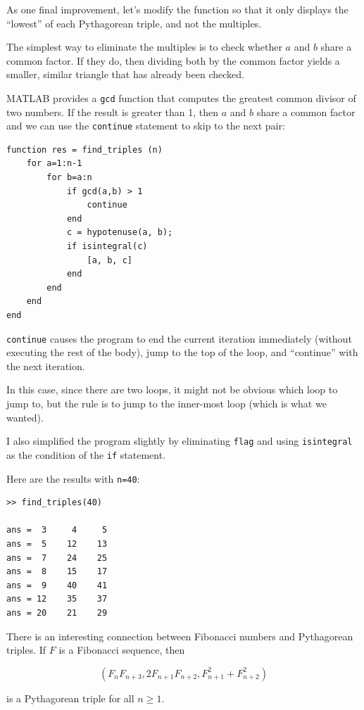 \documentclass[
]{book}
\begin{document}
As one final improvement, let's modify the function so that it only
displays the ``lowest'' of each Pythagorean triple, and not the
multiples.

The simplest way to eliminate the multiples is to check whether
$a$ and $b$ share a common factor.  If they do, then dividing both
by the common factor yields a smaller, similar triangle that has
already been checked.

MATLAB provides a {\tt gcd} function that computes the greatest common
divisor of two numbers.  If the result is greater than 1, then
$a$ and $b$ share a common factor and we can use the {\tt continue}
statement to skip to the next pair:

\begin{verbatim}
function res = find_triples (n)
    for a=1:n-1
        for b=a:n
            if gcd(a,b) > 1
                continue
            end
            c = hypotenuse(a, b);
            if isintegral(c)
                [a, b, c]
            end
        end
    end
end
\end{verbatim}

{\tt continue} causes the program to end the current iteration
immediately (without executing the rest of the body), jump to
the top of the loop, and ``continue'' with the next iteration.

In this case, since there are two loops, it might not be obvious
which loop to jump to, but the rule is to jump to the inner-most
loop (which is what we wanted).

I also simplified the program slightly by eliminating
{\tt flag} and using {\tt isintegral} as the condition of the
{\tt if} statement.

Here are the results with {\tt n=40}:

\begin{verbatim}
>> find_triples(40)

ans =  3     4     5
ans =  5    12    13
ans =  7    24    25
ans =  8    15    17
ans =  9    40    41
ans = 12    35    37
ans = 20    21    29
\end{verbatim}

There is an interesting connection between Fibonacci numbers and
Pythagorean triples.  If $F$ is a Fibonacci sequence, then

\begin{equation}
(F_n F_{n+3}, 2 F_{n+1} F_{n+2}, F_{n+1}^2 + F_{n+2}^2 )
\end{equation}

is a Pythagorean triple for all $n \ge 1$.
\end{document}
